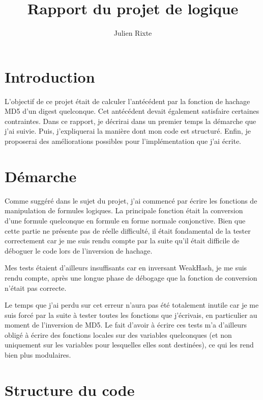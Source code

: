 \documentclass{article}
\title{Rapport du projet de logique}
\author{Julien Rixte}
\begin{document}
\maketitle

\section{Introduction}
L'objectif de ce projet était de calculer l'antécédent par la fonction de hachage MD5 d'un digest quelconque. Cet antécédent devait également satisfaire certaines contraintes. 
Dans ce rapport, je décrirai dans un premier temps la démarche que j'ai suivie. Puis, j'expliquerai la manière dont mon code est structuré. Enfin, je proposerai des améliorations possibles pour l'implémentation que j'ai écrite.

\section{Démarche}
Comme suggéré dans le sujet du projet, j'ai commencé par écrire les fonctions de manipulation de formules logiques. La principale fonction était la conversion d'une formule quelconque en formule en forme normale conjonctive. Bien que cette partie ne présente pas de réelle difficulté, il était fondamental de la tester correctement car je me suis rendu compte par la suite qu'il était difficile de déboguer le code lors de l'inversion de hachage. \par

Mes tests étaient d'ailleurs insuffisants car en inversant WeakHash, je me suis rendu compte, après une longue phase de débogage que la fonction de conversion n'était pas correcte. \par

Le temps que j'ai perdu sur cet erreur n'aura pas été totalement inutile car je me suis forcé par la suite à tester toutes les fonctions que j'écrivais, en particulier au moment de l'inversion de MD5. Le fait d'avoir à écrire ces tests m'a d'ailleurs obligé à écrire des fonctions locales sur des variables quelconques (et non uniquement sur les variables pour lesquelles elles sont destinées), ce qui les rend bien plus modulaires.

\section{Structure du code}
\end{document}
